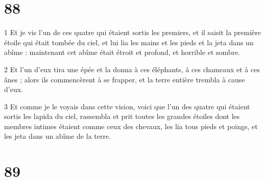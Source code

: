 \chapter{88}

\par 1 Et je vis l'un de ces quatre qui étaient sortis les premiers, et il saisit la première étoile qui était tombée du ciel, et lui lia les mains et les pieds et la jeta dans un abîme : maintenant cet abîme était étroit et profond, et horrible et sombre.
\par 2 Et l'un d'eux tira une épée et la donna à ces éléphants, à ces chameaux et à ces ânes ; alors ils commencèrent à se frapper, et la terre entière trembla à cause d'eux.
\par 3 Et comme je le voyais dans cette vision, voici que l'un des quatre qui étaient sortis les lapida du ciel, rassembla et prit toutes les grandes étoiles dont les membres intimes étaient comme ceux des chevaux, les lia tous pieds et poings, et les jeta dans un abîme de la terre.

\chapter{89}

